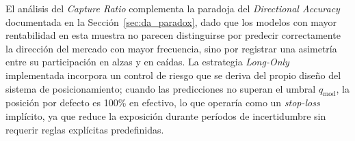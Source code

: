 El an\'alisis del \textit{Capture Ratio} complementa la paradoja del \textit{Directional Accuracy} documentada en la Secci\'on~\ref{sec:da_paradox}, dado que los modelos con mayor rentabilidad en esta muestra no parecen distinguirse por predecir correctamente la direcci\'on del mercado con mayor frecuencia, sino por registrar una asimetr\'ia entre su participaci\'on en alzas y en ca\'idas. La estrategia \textit{Long-Only} implementada incorpora un control de riesgo que se deriva del propio dise\~no del sistema de posicionamiento; cuando las predicciones no superan el umbral $q_{\text{mod}}$, la posici\'on por defecto es 100\% en efectivo, lo que operar\'ia como un \textit{stop-loss} impl\'icito, ya que reduce la exposici\'on durante per\'iodos de incertidumbre sin requerir reglas expl\'icitas predefinidas.

